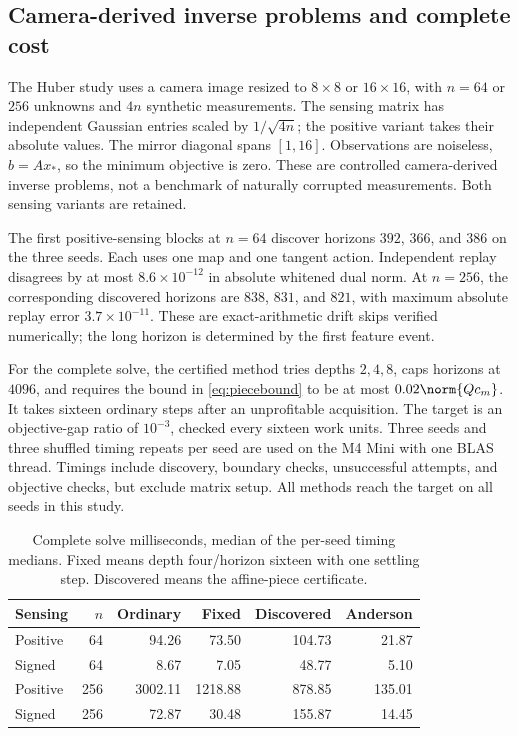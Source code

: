 \subsection{Camera-derived inverse problems and complete cost}

The Huber study uses a camera image resized to $8\times8$ or $16\times16$, with $n=64$ or $256$ unknowns and $4n$ synthetic measurements. The sensing matrix has independent Gaussian entries scaled by $1/\sqrt{4n}$; the positive variant takes their absolute values. The mirror diagonal spans $[1,16]$. Observations are noiseless, $b=Ax_*$, so the minimum objective is zero. These are controlled camera-derived inverse problems, not a benchmark of naturally corrupted measurements. Both sensing variants are retained.

The first positive-sensing blocks at $n=64$ discover horizons $392$, $366$, and $386$ on the three seeds. Each uses one map and one tangent action. Independent replay disagrees by at most $8.6\times10^{-12}$ in absolute whitened dual norm. At $n=256$, the corresponding discovered horizons are $838$, $831$, and $821$, with maximum absolute replay error $3.7\times10^{-11}$. These are exact-arithmetic drift skips verified numerically; the long horizon is determined by the first feature event.

For the complete solve, the certified method tries depths $2,4,8$, caps horizons at $4096$, and requires the bound in \eqref{eq:piecebound} to be at most $0.02\norm{Qc_m}$. It takes sixteen ordinary steps after an unprofitable acquisition. The target is an objective-gap ratio of $10^{-3}$, checked every sixteen work units. Three seeds and three shuffled timing repeats per seed are used on the M4 Mini with one BLAS thread. Timings include discovery, boundary checks, unsuccessful attempts, and objective checks, but exclude matrix setup. All methods reach the target on all seeds in this study.

\begin{table}[htbp]\centering\small

\begin{tabular}{lr rrrr}\toprule

Sensing & $n$ & Ordinary & Fixed & Discovered & Anderson\\\midrule

Positive & 64 & 94.26 & 73.50 & 104.73 & 21.87\\

Signed & 64 & 8.67 & 7.05 & 48.77 & 5.10\\

Positive & 256 & 3002.11 & 1218.88 & 878.85 & 135.01\\

Signed & 256 & 72.87 & 30.48 & 155.87 & 14.45\\

\bottomrule\end{tabular}

\caption{Complete solve milliseconds, median of the per-seed timing medians. Fixed means depth four/horizon sixteen with one settling step. Discovered means the affine-piece certificate.}

\label{tab:discovery}\end{table}

